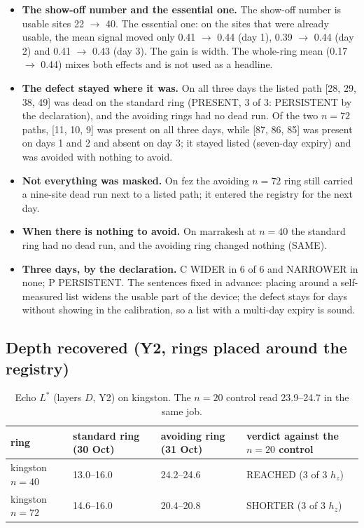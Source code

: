 \documentclass[11pt]{article}
\begin{document}
\begin{itemize}
\item \textbf{The show-off number and the essential one.} The show-off number is usable sites 22 $\to$ 40. The essential
  one: on the sites that were already usable, the mean signal moved only 0.41 $\to$ 0.44 (day 1), 0.39 $\to$ 0.44
  (day 2) and 0.41 $\to$ 0.43 (day 3). The gain is width. The whole-ring mean (0.17 $\to$ 0.44) mixes both effects and is not used as a headline.
\item \textbf{The defect stayed where it was.} On all three days the listed path [28, 29, 38, 49] was dead on the
  standard ring (PRESENT, 3 of 3: PERSISTENT by the declaration), and the avoiding rings had no dead run. Of the two
  $n=72$ paths, [11, 10, 9] was present on all three days, while [87, 86, 85] was present on days 1 and 2 and absent
  on day 3; it stayed listed (seven-day expiry) and was avoided with nothing to avoid.
\item \textbf{Not everything was masked.} On fez the avoiding $n=72$ ring still carried a nine-site dead run next to a
  listed path; it entered the registry for the next day.
\item \textbf{When there is nothing to avoid.} On marrakesh at $n=40$ the standard ring had no dead run, and the avoiding
  ring changed nothing (SAME).
\item \textbf{Three days, by the declaration.} C WIDER in 6 of 6 and NARROWER in none; P PERSISTENT. The sentences
  fixed in advance: placing around a self-measured list widens the usable part of the device; the defect stays for
  days without showing in the calibration, so a list with a multi-day expiry is sound.
\end{itemize}

\subsection{Depth recovered (Y2, rings placed around the registry)}
\begin{table}[h]
\centering\small
\begin{tabular}{llll}
\toprule
ring & standard ring (30 Oct) & avoiding ring (31 Oct) & verdict against the $n=20$ control \\
\midrule
kingston $n=40$ & 13.0--16.0 & 24.2--24.6 & REACHED (3 of 3 $h_z$) \\
kingston $n=72$ & 14.6--16.0 & 20.4--20.8 & SHORTER (3 of 3 $h_z$) \\
\bottomrule
\end{tabular}
\caption{Echo $L^*$ (layers $D$, Y2) on kingston. The $n=20$ control read 23.9--24.7 in the same job.}
\label{tab:depth}
\end{table}
\end{document}
